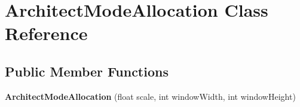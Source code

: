 \hypertarget{classArchitectModeAllocation}{\section{Architect\-Mode\-Allocation Class Reference}
\label{classArchitectModeAllocation}
}
\subsection*{Public Member Functions}
\begin{DoxyCompactItemize}
\item 
\hypertarget{classArchitectModeAllocation_abbd3f1e09bee4d0aec95d2a821fb4393}{{\bfseries Architect\-Mode\-Allocation} (float scale, int window\-Width, int window\-Height)}\label{classArchitectModeAllocation_abbd3f1e09bee4d0aec95d2a821fb4393}

\end{DoxyCompactItemize}
